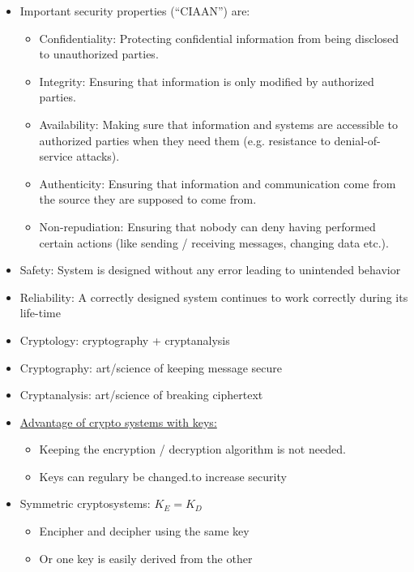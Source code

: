 \documentclass[landscape, a4paper]{article}
\begin{document}
\fontsize{4pt}{5pt}\selectfont

\begin{minipage}[t]{0.19\pagewidth}
	\begin{itemize}
		\item \alert{Important security properties (\enquote{CIAAN}) are:}
		\begin{itemize}
			\item \alert{Confidentiality:} Protecting confidential information from being disclosed to unauthorized parties.
			\item \alert{Integrity:} Ensuring that information is only modified by authorized parties.
			\item \alert{Availability:} Making sure that information and systems are accessible to authorized parties when they need them (e.g. resistance to denial-of-service attacks).
			\item \alert{Authenticity:} Ensuring that information and communication come from the source they are supposed to come from.
			\item \alert{Non-repudiation:} Ensuring that nobody can deny having performed certain actions (like sending / receiving messages, changing data etc.).
		\end{itemize}
		\item \alert{Safety:} System is designed without any error leading to unintended behavior
		\item  \alert{Reliability:} A correctly designed system continues to work correctly during its life-time
		\item \alert{Cryptology:} cryptography + cryptanalysis
		\item \alert{Cryptography:} art/science of keeping message secure
		\item \alert{Cryptanalysis:} art/science of breaking ciphertext
		\item \underline{Advantage of crypto systems with keys:}
		\begin{itemize}
			\item  Keeping the encryption / decryption algorithm is not needed.
			\item  Keys can regulary be changed.to increase security
		\end{itemize}
		\item \alert{Symmetric cryptosystems:} $K_E = K_D$
		\begin{itemize}
			\item Encipher and decipher using the same key
			\item Or one key is easily derived from the other

\end{itemize}
\end{itemize}
\end{minipage}
\end{document}
